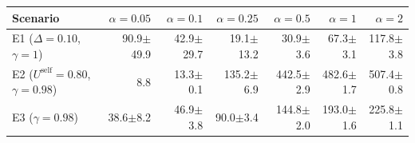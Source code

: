 \begin{tabular}{lrrrrrr}
\toprule
Scenario & $\alpha=0.05$ & $\alpha=0.1$ & $\alpha=0.25$ & $\alpha=0.5$ & $\alpha=1$ & $\alpha=2$ \\
\midrule
E1 ($\Delta{=}0.10$, $\gamma{=}1$) & 90.9{\scriptsize$\pm$49.9} & 42.9{\scriptsize$\pm$29.7} & 19.1{\scriptsize$\pm$13.2} & 30.9{\scriptsize$\pm$3.6} & 67.3{\scriptsize$\pm$3.1} & 117.8{\scriptsize$\pm$3.8} \\
E2 ($U^{\mathrm{self}}{=}0.80$, $\gamma{=}0.98$) & 8.8 & 13.3{\scriptsize$\pm$0.1} & 135.2{\scriptsize$\pm$6.9} & 442.5{\scriptsize$\pm$2.9} & 482.6{\scriptsize$\pm$1.7} & 507.4{\scriptsize$\pm$0.8} \\
E3 ($\gamma{=}0.98$) & 38.6{\scriptsize$\pm$8.2} & 46.9{\scriptsize$\pm$3.8} & 90.0{\scriptsize$\pm$3.4} & 144.8{\scriptsize$\pm$2.0} & 193.0{\scriptsize$\pm$1.6} & 225.8{\scriptsize$\pm$1.1} \\
\bottomrule
\end{tabular}
